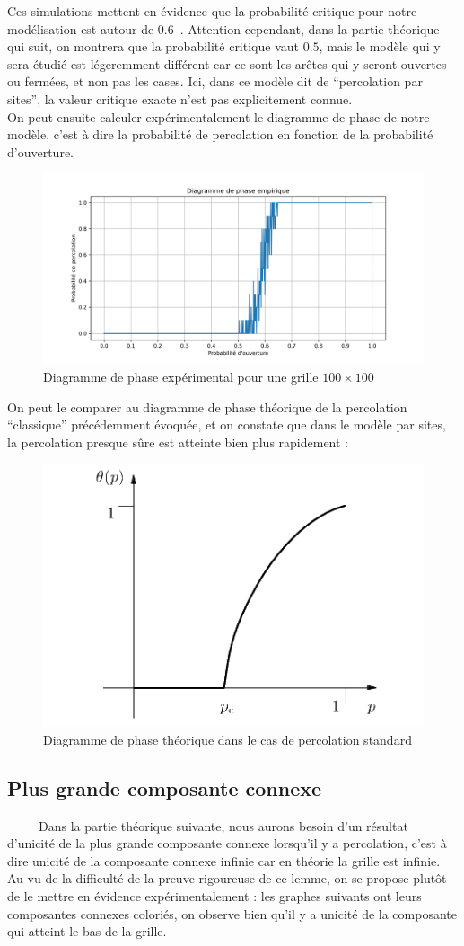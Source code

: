 \documentclass[11pt,a4paper]{article}
\begin{document}
Ces simulations mettent en évidence que la probabilité critique pour notre modélisation est autour de $0.6$\ . Attention cependant, dans la partie théorique qui suit, on montrera que la probabilité critique vaut $0.5$, mais le modèle qui y sera étudié est légeremment différent car ce sont les arêtes qui y seront ouvertes ou fermées, et non pas les cases. Ici, dans ce modèle dit de ``percolation par sites'', la valeur critique exacte n'est pas explicitement connue. \\

On peut ensuite calculer expérimentalement le diagramme de phase de notre modèle, c'est à dire la probabilité de percolation en fonction de la probabilité d'ouverture.
\begin{figure}[htbp]
    \centering
    \includegraphics[width=0.6 \textwidth]{./Pictures/percolation_probability.png}
    \caption{Diagramme de phase expérimental pour une grille $100\times 100$}
    \label{fig:phase}
\end{figure}

On peut le comparer au diagramme de phase théorique de la percolation ``classique'' précédemment évoquée, et on constate que dans le modèle par sites, la percolation presque sûre est atteinte bien plus rapidement : 

\begin{figure}[htbp]
    \centering
    \includegraphics[width=0.4 \textwidth]{./Pictures/ph_th.png}
    \caption{Diagramme de phase théorique dans le cas de percolation standard \cite{grimmett}}
    \label{fig:phase_th}
\end{figure}

\subsection{Plus grande composante connexe}
\ \ \ \ \ Dans la partie théorique suivante, nous aurons besoin d'un résultat d'unicité de la plus grande composante connexe lorsqu'il y a percolation, c'est à dire unicité de la composante connexe infinie car en théorie la grille est infinie. Au vu de la difficulté de la preuve rigoureuse de ce lemme, on se propose plutôt de le mettre en évidence expérimentalement : les graphes suivants ont leurs composantes connexes coloriés, on observe bien qu'il y a unicité de la composante qui atteint le bas de la grille. 
\end{document}
